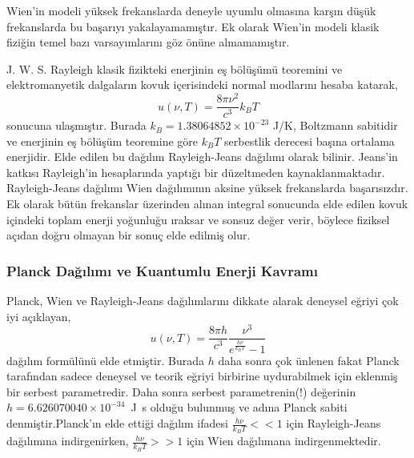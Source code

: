 \documentclass[a4paper,12pt, twoside]{article}
\begin{document}
Wien'in modeli yüksek frekanslarda deneyle uyumlu olmasına karşın düşük frekanslarda bu başarıyı yakalayamamıştır. Ek olarak Wien'in modeli klasik fiziğin temel bazı varsayımlarını göz önüne almamamıştır. 

J. W. S. Rayleigh klasik fizikteki enerjinin eş bölüşümü teoremini ve elektromanyetik dalgaların kovuk içerisindeki normal modlarını hesaba katarak,
%
\begin{equation}
\label{eq:Rayleigh}
u(\nu, T) = \frac{8 \pi \nu^{2}}{c^{3}} k_{B} T
\end{equation}
sonucuna ulaşmıştır. Burada $k_B = 1.38064852 \times 10^{-23}$ J/K, Boltzmann sabitidir ve enerjinin eş bölüşüm teoremine göre $k_B T$ serbestlik derecesi başına ortalama enerjidir. Elde edilen bu dağılım Rayleigh-Jeans dağılımı olarak bilinir. Jeans'in katkısı Rayleigh'in hesaplarında yaptığı bir düzeltmeden kaynaklanmaktadır. Rayleigh-Jeans dağılımı Wien dağılımının aksine yüksek frekanslarda başarısızdır. Ek olarak bütün frekanslar üzerinden alınan integral sonucunda elde edilen kovuk içindeki toplam enerji yoğunluğu ıraksar ve sonsuz değer verir, böylece fiziksel açıdan doğru olmayan bir sonuç elde edilmiş olur.






\subsubsection{Planck Dağılımı ve Kuantumlu Enerji Kavramı}

Planck, Wien ve Rayleigh-Jeans dağılımlarını dikkate alarak deneysel eğriyi çok iyi açıklayan,
\begin{equation}
\label{eq:Planck}
u(\nu, T) = \frac{8 \pi h}{c^{3}} \frac{\nu^{3}}{e^{\frac{h \nu}{k_{B} T}} - 1}
\end{equation} 
dağılım formülünü elde etmiştir. Burada $h$ daha sonra çok ünlenen fakat Planck tarafından sadece deneysel ve teorik eğriyi birbirine uydurabilmek için eklenmiş bir serbest parametredir. Daha sonra serbest parametrenin(!) değerinin $h=6.626070040 \times 10^{-34}$~J~s olduğu bulunmuş ve adına Planck sabiti denmiştir.Planck'ın elde ettiği dağılım ifadesi $\frac{h\nu}{k_B T}<<1$ için Rayleigh-Jeans dağılımına indirgenirken, $\frac{h\nu}{k_B T}>>1$ için Wien dağılımana indirgenmektedir.
\end{document}
